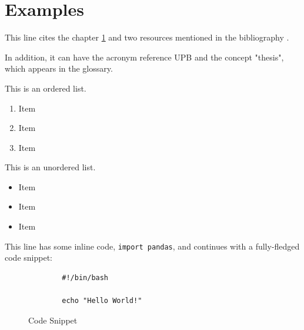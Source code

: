 \documentclass[../main.tex]{subfiles}
\begin{document}
\hypertarget{chapter}{
    \chapter{Examples}
    \label{chapter}
}

This line cites the chapter \ref{chapter} and two resources mentioned in the
bibliography \cite{article} \cite{website}.

In addition, it can have the acronym reference \ac{UPB} and the concept
"\gls{thesis}", which appears in the glossary.

This is an ordered list.

\begin{enumerate}
    \item Item
    \item Item
    \item Item
\end{enumerate}

This is an unordered list.

\begin{itemize}
    \item Item
    \item Item
    \item Item
\end{itemize}

\newpage

This line has some inline code, \texttt{import pandas}, and continues with a
fully-fledged code snippet:

\begin{figure}[!ht]
    \centering
    \begin{verbatim}
        #!/bin/bash
        
        echo "Hello World!"
    \end{verbatim}
    \caption{Code Snippet}
\end{figure}
\end{document}
